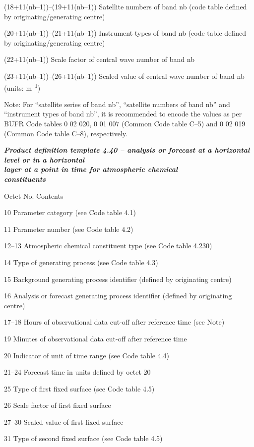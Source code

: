 (18+11(nb--1))--(19+11(nb--1)) Satellite numbers of band nb (code table defined by originating/generating centre)

(20+11(nb--1))--(21+11(nb--1)) Instrument types of band nb (code table defined by originating/generating centre)

(22+11(nb--1)) Scale factor of central wave number of band nb

(23+11(nb--1))--(26+11(nb--1)) Scaled value of central wave number of band nb (units: m\textsuperscript{--1})

Note: For ``satellite series of band nb'', ``satellite numbers of band nb'' and ``instrument types of band nb'', it is recommended to encode the values as per BUFR Code tables 0 02 020, 0 01 007 (Common Code table C--5) and 0 02 019 (Common Code table C--8), respectively.

\emph{\textbf{Product definition template 4.40 -- analysis or forecast at a horizontal level or in a horizontal\\
layer at a point in time for atmospheric chemical\\
constituents}}

Octet No. Contents

10 Parameter category (see Code table 4.1)

11 Parameter number (see Code table 4.2)

12--13 Atmospheric chemical constituent type (see Code table 4.230)

14 Type of generating process (see Code table 4.3)

15 Background generating process identifier (defined by originating centre)

16 Analysis or forecast generating process identifier (defined by originating centre)

17--18 Hours of observational data cut-off after reference time (see Note)

19 Minutes of observational data cut-off after reference time

20 Indicator of unit of time range (see Code table 4.4)

21--24 Forecast time in units defined by octet 20

25 Type of first fixed surface (see Code table 4.5)

26 Scale factor of first fixed surface

27--30 Scaled value of first fixed surface

31 Type of second fixed surface (see Code table 4.5)

